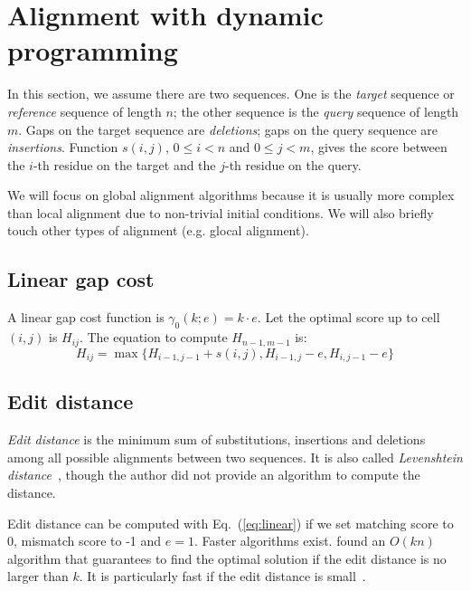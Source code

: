 \documentclass{bioinfo}
\begin{document}
\section{Alignment with dynamic programming}

In this section, we assume there are two sequences. One is the \emph{target}
sequence or \emph{reference} sequence of length $n$; the other sequence is the
\emph{query} sequence of length $m$. Gaps on the target sequence are
\emph{deletions}; gaps on the query sequence are \emph{insertions}. Function
$s(i,j)$, $0\le i<n$ and $0\le j<m$, gives the score between the $i$-th residue
on the target and the $j$-th residue on the query.

We will focus on global alignment algorithms because it is usually more complex
than local alignment due to non-trivial initial conditions. We will also
briefly touch other types of alignment (e.g. glocal alignment).

\subsection{Linear gap cost}

A linear gap cost function is $\gamma_0(k;e)=k\cdot e$. Let the optimal score up
to cell $(i,j)$ is $H_{ij}$. The equation to compute $H_{n-1,m-1}$ is:
\begin{equation}
H_{ij}=\max\{H_{i-1,j-1}+s(i,j), H_{i-1,j}-e, H_{i,j-1}-e\}
\end{equation}

\subsection{Edit distance}

\emph{Edit distance} is the minimum sum of substitutions, insertions and
deletions among all possible alignments between two sequences. It is also
called \emph{Levenshtein distance}~\citep{Levenshtein:1966aa}, though the
author did not provide an algorithm to compute the distance.

Edit distance can be computed with Eq.~(\ref{eq:linear}) if we set matching
score to 0, mismatch score to -1 and $e=1$. Faster algorithms exist.
\citet{Landau:1986aa} found an $O(kn)$ algorithm that guarantees to find
the optimal solution if the edit distance is no larger than $k$. It is
particularly fast if the edit distance is small~\citep{Sosic:2015aa}.
\end{document}
